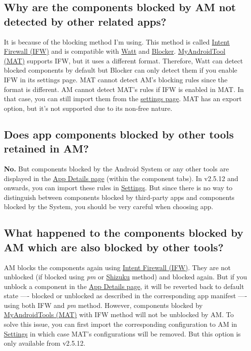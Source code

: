 \subsection{Why are the components blocked by AM not detected by other related apps?}
It is because of the blocking method I'm using. This method is called
\href{https://carteryagemann.com/pages/android-intent-firewall.html}{Intent Firewall (IFW)} and is compatible with
\href{https://github.com/tuyafeng/Watt}{Watt} and \href{https://github.com/lihenggui/blocker}{Blocker}.
\href{https://www.myandroidtools.com}{MyAndroidTool (MAT)} supports IFW, but it uses a different format. Therefore,
Watt can detect blocked components by default but Blocker can only detect them if you enable IFW in its settings page.
MAT cannot detect AM's blocking rules since the format is different. AM cannot detect MAT's rules if IFW is enabled in
MAT. In that case, you can still import them from the \hyperref[sec:settings-page]{settings page}. MAT has an export
option, but it's not supported due to its non-free nature.

\subsection{Does app components blocked by other tools retained in AM?}
\textbf{No.} But components blocked by the Android System or any other tools are displayed in the
\hyperref[sec:app-details-page]{App Details page} (within the component tabs). In v2.5.12 and onwards, you can import
these rules in \hyperref[par:import-existing-rules]{Settings}. But since there is no way to distinguish between
components blocked by third-party apps and components blocked by the System, you should be very careful when choosing
app.

\subsection{What happened to the components blocked by AM which are also blocked by other tools?}
AM blocks the components again using
\href{https://carteryagemann.com/pages/android-intent-firewall.html}{Intent Firewall (IFW)}. They are not unblocked (if
blocked using \textit{pm} or \href{https://github.com/RikkaApps/Shizuku}{Shizuku} method) and blocked again. But if you
unblock a component in the \hyperref[sec:app-details-page]{App Details page}, it will be reverted back to default state
—- blocked or unblocked as described in the corresponding app manifest —- using both IFW and \textit{pm} method.
However, components blocked by \href{https://www.myandroidtools.com}{MyAndroidTools (MAT)} with IFW method will not be
unblocked by AM. To solve this issue, you can first import the corresponding configuration to AM in
\hyperref[par:import-existing-rules]{Settings} in which case MAT's configurations will be removed. But this option is
only available from v2.5.12.

